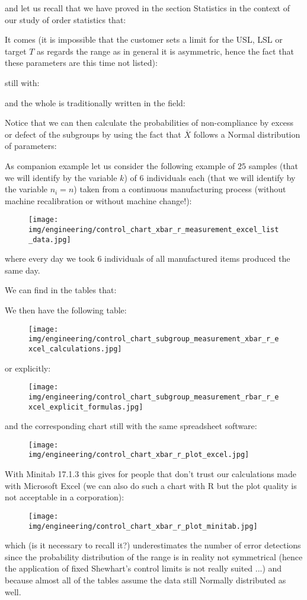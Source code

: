 	and let us recall that we have proved in the section Statistics in the context of our study of order statistics that:
	
	It comes (it is impossible that the customer sets a limit for the USL, LSL or target $T$ as regards the range as in general it is asymmetric, hence the fact that these parameters are this time not listed):
	
	still with:
	
	and the whole is traditionally written in the field:
	
	Notice that we can then calculate the probabilities of non-compliance by excess or defect of the subgroups by using the fact that $\overline{X}$ follows a Normal distribution of parameters:
	
	
	As companion example let us consider the following example of $25$ samples (that we will identify by the variable $k$) of $6$ individuals each (that we will identify by the variable $n_i=n$) taken from a continuous manufacturing process (without machine recalibration or without machine change!):
	\begin{figure}[H]
		\centering
		\texttt{[image: img/engineering/control\_chart\_xbar\_r\_measurement\_excel\_list\_data.jpg]}
	\end{figure}
	where every day we took $6$ individuals of all manufactured items produced the same day.
	
	We can find in the tables that:
	
	We then have the following table:
	\begin{figure}[H]
		\centering
		\texttt{[image: img/engineering/control\_chart\_subgroup\_measurement\_xbar\_r\_excel\_calculations.jpg]}
	\end{figure}
	or explicitly:
	\begin{figure}[H]
		\centering
		\texttt{[image: img/engineering/control\_chart\_subgroup\_measurement\_rbar\_r\_excel\_explicit\_formulas.jpg]}
	\end{figure}
	and the corresponding chart still with the same spreadsheet software:
	\begin{figure}[H]
		\centering
		\texttt{[image: img/engineering/control\_chart\_xbar\_r\_plot\_excel.jpg]}
	\end{figure}
	With Minitab 17.1.3 this gives for people that don't trust our calculations made with Microsoft Excel (we can also do such a chart with R but the plot quality is not acceptable in a corporation):
	\begin{figure}[H]
		\centering
		\texttt{[image: img/engineering/control\_chart\_xbar\_r\_plot\_minitab.jpg]}
	\end{figure}
	which (is it necessary to recall it?) underestimates the number of error detections since the probability distribution of the range is in reality not symmetrical (hence the application of fixed Shewhart's control limits is not really suited ...) and because almost all of the tables assume the data still Normally distributed as well.
	
